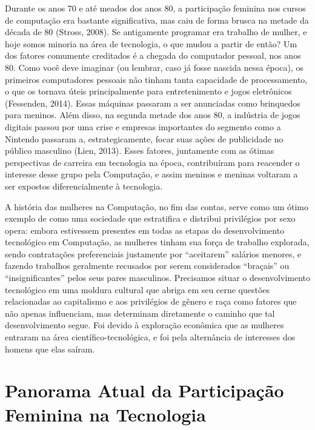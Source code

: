 Durante os anos 70 e até meados dos anos 80, a participação feminina nos cursos de computação era bastante significativa, mas caiu de forma brusca na metade da década de 80 (Stross, 2008). Se antigamente programar era trabalho de mulher, e hoje somos minoria na área de tecnologia, o que mudou a partir de então? Um dos fatores comumente creditados é a chegada do computador pessoal, nos anos 80. Como você deve imaginar (ou lembrar, caso já fosse nascida nessa época), os primeiros computadores pessoais não tinham tanta capacidade de processamento, o que os tornava úteis principalmente para entretenimento e jogos eletrônicos (Fessenden, 2014). Essas máquinas passaram a ser anunciadas como brinquedos para meninos. Além disso, na segunda metade dos anos 80, a indústria de jogos digitais passou por uma crise e empresas importantes do segmento como a Nintendo passaram a, estrategicamente, focar suas ações de publicidade no público masculino (Lien, 2013). Esses fatores, juntamente com as ótimas perspectivas de carreira em tecnologia na época, contribuíram para reacender o interesse desse grupo pela Computação, e assim meninos e meninas voltaram a ser expostos diferencialmente à tecnologia. 

A história das mulheres na Computação, no fim das contas, serve como um ótimo exemplo de como uma sociedade que estratifica e distribui privilégios por sexo opera: embora estivessem presentes em todas as etapas do desenvolvimento tecnológico em Computação, as mulheres tinham sua força de trabalho explorada, sendo contratações preferenciais justamente por “aceitarem” salários menores, e fazendo trabalhos geralmente recusados por serem considerados “braçais” ou “insignificantes” pelos seus pares masculinos. Precisamos situar o desenvolvimento tecnológico em uma moldura cultural que abriga em seu cerne questões relacionadas ao capitalismo e aos privilégios de gênero e raça como fatores que não apenas influenciam, mas determinam diretamente o caminho que tal desenvolvimento segue. Foi devido à exploração econômica que as mulheres entraram na área científico-tecnológica, e foi pela alternância de interesses dos homens que elas saíram.

\section*{Panorama Atual da Participação Feminina na Tecnologia}

